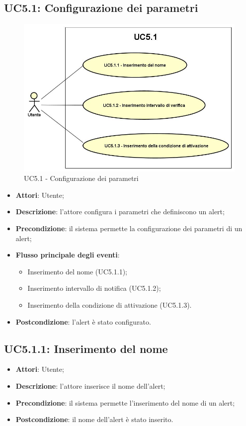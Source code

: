 \subsection{UC5.1: Configurazione dei parametri}
\hypertarget{UC5.1}{}
\begin{figure} [H]
	\centering
	\includegraphics[scale=0.45]{Img/UC5-1}
	\caption{UC5.1 - Configurazione dei parametri}\label{}
\end{figure}
\begin{itemize}
	\item \textbf{Attori}: Utente;
	\item \textbf{Descrizione}: l'attore configura i parametri che definiscono un alert;
	\item \textbf{Precondizione}: il sistema permette la configurazione dei parametri di un alert;
	\item \textbf{Flusso principale degli eventi}:
	\begin{itemize}
		\item Inserimento del nome (UC5.1.1);
		\item Inserimento intervallo di notifica (UC5.1.2);
		\item Inserimento della condizione di attivazione (UC5.1.3).
	\end{itemize}
	\item \textbf{Postcondizione}: l'alert è stato configurato.
\end{itemize}

\subsection{UC5.1.1: Inserimento del nome}
\hypertarget{UC5.1.1}{}
\begin{itemize}
	\item \textbf{Attori}: Utente;
	\item \textbf{Descrizione}: l'attore inserisce il nome dell'alert;
	\item \textbf{Precondizione}: il sistema permette l'inserimento del nome di un alert;
	\item \textbf{Postcondizione}: il nome dell'alert è stato inserito.
\end{itemize}

